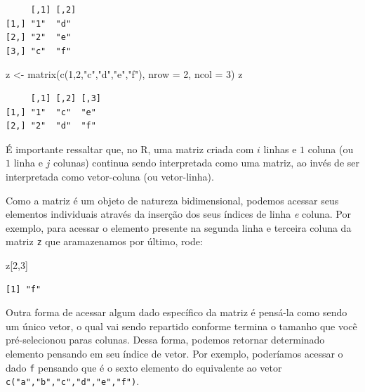 \documentclass[
  letterpaper,
  DIV=11,
  numbers=noendperiod]{scrreprt}
\newenvironment{Shaded}{\begin{snugshade}}{\end{snugshade}}
\newcommand{\AttributeTok}[1]{\textcolor[rgb]{0.40,0.45,0.13}{#1}}
\newcommand{\DecValTok}[1]{\textcolor[rgb]{0.68,0.00,0.00}{#1}}
\newcommand{\FunctionTok}[1]{\textcolor[rgb]{0.28,0.35,0.67}{#1}}
\newcommand{\NormalTok}[1]{\textcolor[rgb]{0.00,0.23,0.31}{#1}}
\newcommand{\OtherTok}[1]{\textcolor[rgb]{0.00,0.23,0.31}{#1}}
\newcommand{\StringTok}[1]{\textcolor[rgb]{0.13,0.47,0.30}{#1}}
\begin{document}
\begin{verbatim}
     [,1] [,2]
[1,] "1"  "d" 
[2,] "2"  "e" 
[3,] "c"  "f" 
\end{verbatim}

\begin{Shaded}
\begin{Highlighting}[]
\NormalTok{z }\OtherTok{\textless{}{-}} \FunctionTok{matrix}\NormalTok{(}\FunctionTok{c}\NormalTok{(}\DecValTok{1}\NormalTok{,}\DecValTok{2}\NormalTok{,}\StringTok{"c"}\NormalTok{,}\StringTok{"d"}\NormalTok{,}\StringTok{"e"}\NormalTok{,}\StringTok{"f"}\NormalTok{), }\AttributeTok{nrow =} \DecValTok{2}\NormalTok{, }\AttributeTok{ncol =} \DecValTok{3}\NormalTok{) }
\NormalTok{z}
\end{Highlighting}
\end{Shaded}

\begin{verbatim}
     [,1] [,2] [,3]
[1,] "1"  "c"  "e" 
[2,] "2"  "d"  "f" 
\end{verbatim}

É importante ressaltar que, no R, uma matriz criada com \(i\) linhas e
\(1\) coluna (ou \(1\) linha e \(j\) colunas) continua sendo
interpretada como uma matriz, ao invés de ser interpretada como
vetor-coluna (ou vetor-linha).

Como a matriz é um objeto de natureza bidimensional, podemos acessar
seus elementos individuais através da inserção dos seus índices de linha
\emph{e} coluna. Por exemplo, para acessar o elemento presente na
segunda linha e terceira coluna da matriz \texttt{z} que aramazenamos
por último, rode:

\begin{Shaded}
\begin{Highlighting}[]
\NormalTok{z[}\DecValTok{2}\NormalTok{,}\DecValTok{3}\NormalTok{]}
\end{Highlighting}
\end{Shaded}

\begin{verbatim}
[1] "f"
\end{verbatim}

Outra forma de acessar algum dado específico da matriz é pensá-la como
sendo um único vetor, o qual vai sendo repartido conforme termina o
tamanho que você pré-selecionou paras colunas. Dessa forma, podemos
retornar determinado elemento pensando em seu índice de vetor. Por
exemplo, poderíamos acessar o dado \texttt{f} pensando que é o sexto
elemento do equivalente ao vetor \texttt{c("a","b","c","d","e","f")}.
\end{document}
